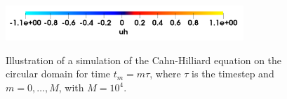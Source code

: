 \documentclass[11pt]{article}
\theoremstyle{remark}
\numberwithin{equation}{section}
\begin{document}
\begin{figure}[]
{    }\hfill
    \\
    \vspace{10pt}
    \hfill
    \hfill
    \hfill
    \vspace{10pt}
        \includegraphics[width=0.8\textwidth]{results/illustration/colobar.png}

\caption{Illustration of a simulation of the Cahn-Hilliard equation on the circular domain for time $ t_{m} = m\tau $, where $\tau $ is the timestep and $m= 0,\ldots, M $, with $M = 10^4$.}
        \label{sub:fig:ill_circle}
\end{figure}
\end{document}
